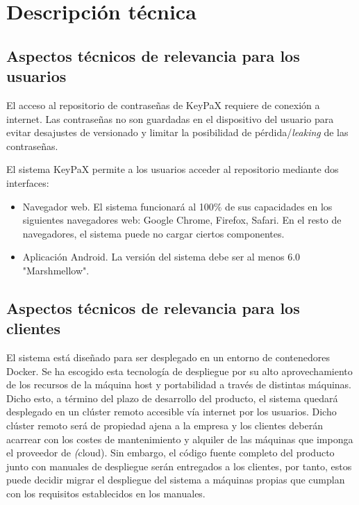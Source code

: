 \documentclass{article}
\begin{document}
\pagebreak

\section{Descripción técnica}

\subsection{Aspectos técnicos de relevancia para los usuarios}

El acceso al repositorio de contraseñas de KeyPaX requiere de conexión a internet. Las contraseñas no son guardadas en el dispositivo del usuario para evitar desajustes de versionado y limitar la posibilidad de pérdida/\textit{leaking} de las contraseñas.

El sistema KeyPaX permite a los usuarios acceder al repositorio mediante dos interfaces:
\begin{itemize}
    \setlength\itemsep{0em}
    \item Navegador web. El sistema funcionará al 100\% de sus capacidades en los siguientes navegadores web: Google Chrome, Firefox, Safari. En el resto de navegadores, el sistema puede no cargar ciertos componentes.
    \item Aplicación Android. La versión del sistema debe ser al menos 6.0 "Marshmellow".
\end{itemize}

\subsection{Aspectos técnicos de relevancia para los clientes}

El sistema está diseñado para ser desplegado en un entorno de contenedores Docker.
Se ha escogido esta tecnología de despliegue por su alto aprovechamiento de los recursos de la máquina host y portabilidad a través de distintas máquinas.
Dicho esto, a término del plazo de desarrollo del producto, el sistema quedará desplegado en un clúster remoto accesible vía internet por los usuarios. Dicho clúster remoto será de propiedad ajena a la empresa y los clientes deberán acarrear con los costes de mantenimiento y alquiler de las máquinas que imponga el proveedor de \textit(cloud).
Sin embargo, el código fuente completo del producto junto con manuales de despliegue serán entregados a los clientes, por tanto, estos puede decidir migrar el despliegue del sistema a máquinas propias que cumplan con los requisitos establecidos en los manuales.
\end{document}

